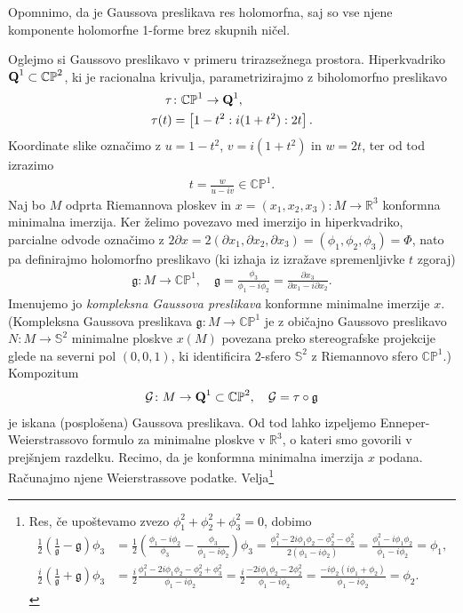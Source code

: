 \documentclass[12pt,a4paper,twoside]{article}
\theoremstyle{definition} %
\theoremstyle{plain} %
\numberwithin{equation}{section}  %
\begin{document}
Opomnimo, da je Gaussova preslikava res holomorfna, saj so vse njene komponente holomorfne 1-forme brez skupnih ničel.

Oglejmo si Gaussovo preslikavo v primeru trirazsežnega prostora. Hiperkvadriko $\textup{\textbf{Q}}^{1} \subset \mathbb{CP}^{2}$, ki je racionalna krivulja, parametrizirajmo z biholomorfno preslikavo 
\begin{align}
\tau &\colon \mathbb{CP}^{1} \to \textup{\textbf{Q}}^{1}, \nonumber \\
\tau (t) &= \left[ 1-t^2 : i(1+t^2) : 2t \right].
\end{align}
Koordinate slike označimo z $u = 1-t^2$, $v = i(1+t^2)$ in $w = 2t$, ter od tod izrazimo 
\begin{gather*}
t = \frac{w}{u-iv} \in \mathbb{CP}^{1}.
\end{gather*}
Naj bo $M$ odprta Riemannova ploskev in $x = (x_1,x_2,x_3) \colon M \to \mathbb{R}^{3}$ konformna minimalna imerzija. Ker želimo povezavo med imerzijo in hiperkvadriko, parcialne odvode označimo z $2 \partial x = 2 (\partial x_1, \partial x_2, \partial x_3) = (\phi_1, \phi_2, \phi_3) = \Phi$, nato pa definirajmo holomorfno preslikavo (ki izhaja iz izražave spremenljivke $t$ zgoraj)
\begin{gather}
\mathfrak{g} \colon M \to \mathbb{CP}^{1}, \quad \mathfrak{g} = \frac{\phi_3}{\phi_1 - i\phi_2} = \frac{\partial x_3}{\partial x_1 - i \partial x_2}.
\end{gather}
Imenujemo jo \emph{kompleksna Gaussova preslikava} konformne minimalne imerzije $x$.
(Kompleksna Gaussova preslikava $\mathfrak{g} \colon M \to \mathbb{CP}^{1}$ je z običajno Gaussovo preslikavo $N \colon M \to \mathbb{S}^2$ minimalne ploskve $x(M)$ povezana preko stereografske projekcije glede na severni pol $(0,0,1)$, ki identificira $2$-sfero $\mathbb{S}^2$ z Riemannovo sfero $\mathbb{CP}^{1}$.)
Kompozitum 
\begin{align}
\mathcal{G} \colon M \to \textup{\textbf{Q}}^{1} \subset \mathbb{CP}^{2}, \quad \mathcal{G} = \tau \circ \mathfrak{g}
\end{align}
je iskana (posplošena) Gaussova preslikava.\newline
Od tod lahko izpeljemo Enneper-Weierstrassovo formulo za minimalne ploskve v $\mathbb{R}^{3}$, o kateri smo govorili v prejšnjem razdelku. 
Recimo, da je konformna minimalna imerzija $x$ podana. Računajmo njene Weierstrassove podatke. 
Velja\footnote{Res, če upoštevamo zvezo $\phi_{1}^2 + \phi_{2}^2 + \phi_{3}^2 = 0$, dobimo
\begin{align*}
\frac{1}{2} \left(\frac{1}{\mathfrak{g}} - \mathfrak{g} \right) \phi_3 &= \frac{1}{2} \left( \frac{\phi_1 - i\phi_2}{\phi_3} - \frac{\phi_3}{\phi_1 - i\phi_2} \right) \phi_3 = \frac{\phi_{1}^2 - 2i\phi_1 \phi_2 - \phi_{2}^2 - \phi_{3}^2}{2(\phi_1 - i\phi_2)} = \frac{\phi_{1}^2 - i\phi_1\phi_2}{\phi_1 - i\phi_2} = \phi_1, \\
%
\frac{i}{2} \left(\frac{1}{\mathfrak{g}} + \mathfrak{g} \right) \phi_3 &= \frac{i}{2} \frac{\phi_{1}^2 - 2i\phi_1 \phi_2 - \phi_{2}^2 + \phi_{3}^2}{\phi_1 - i\phi_2} = \frac{i}{2} \frac{-2i\phi_1 \phi_2 - 2\phi_{2}^2}{\phi_1 - i\phi_2} = \frac{-i\phi_2(i\phi_1 + \phi_2)}{\phi_1 - i\phi_2} = \phi_2.
\end{align*}
}
\end{document}
